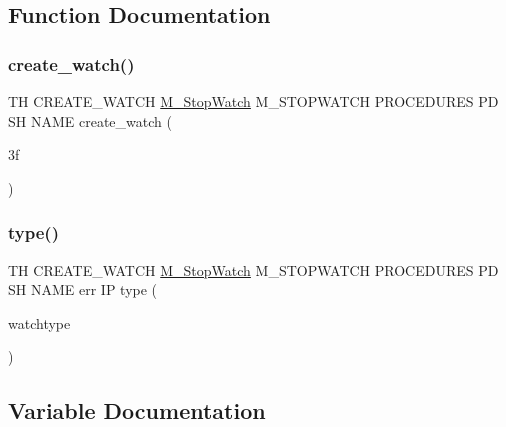 \subsection{Function Documentation}
\mbox{\label{create__watch_83_8txt_a6deb35ddebb447c9dceca30690d1581d}} 
\subsubsection{\texorpdfstring{create\+\_\+watch()}{create\_watch()}}
{\footnotesize\ttfamily TH C\+R\+E\+A\+T\+E\+\_\+\+W\+A\+T\+CH \hyperlink{option__stopwatch_83_8txt_aa2011fc45a5e502e87ee50996a8a9305}{M\+\_\+\+Stop\+Watch} M\+\_\+\+S\+T\+O\+P\+W\+A\+T\+CH P\+R\+O\+C\+E\+D\+U\+R\+ES PD SH N\+A\+ME create\+\_\+watch (\begin{DoxyParamCaption}\item[{3f}]{ }\end{DoxyParamCaption})}

\mbox{\label{create__watch_83_8txt_a6036c8b9d18bd95ef0feb888982faa0b}} 
\subsubsection{\texorpdfstring{type()}{type()}}
{\footnotesize\ttfamily TH C\+R\+E\+A\+T\+E\+\_\+\+W\+A\+T\+CH \hyperlink{option__stopwatch_83_8txt_aa2011fc45a5e502e87ee50996a8a9305}{M\+\_\+\+Stop\+Watch} M\+\_\+\+S\+T\+O\+P\+W\+A\+T\+CH P\+R\+O\+C\+E\+D\+U\+R\+ES PD SH N\+A\+ME err IP type (\begin{DoxyParamCaption}\item[{watchtype}]{ }\end{DoxyParamCaption})}



\subsection{Variable Documentation}
\mbox{\label{create__watch_83_8txt_ae5a722940632dbef0e5f6b03622fbf1c}} 
